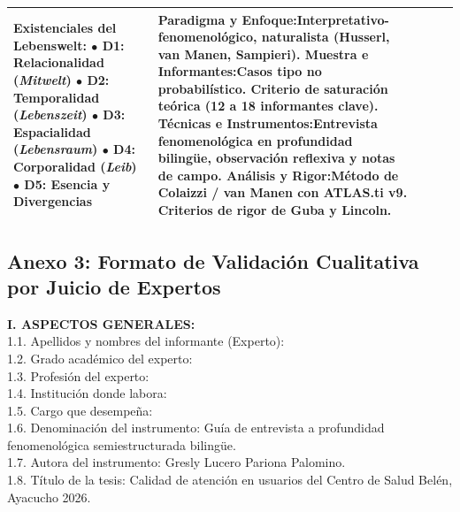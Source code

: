\begin{table}[H]
\begin{tabularx}{\textwidth}{p{2.6cm}p{2.7cm}p{2.6cm}p{2.6cm}X}
\textbf{Existenciales del Lebenswelt:}\newline 
$\bullet$ D1: Relacionalidad (\textit{Mitwelt})\newline 
$\bullet$ D2: Temporalidad (\textit{Lebenszeit})\newline 
$\bullet$ D3: Espacialidad (\textit{Lebensraum})\newline 
$\bullet$ D4: Corporalidad (\textit{Leib})\newline 
$\bullet$ D5: Esencia y Divergencias & 
\textbf{Paradigma y Enfoque:}\newline Interpretativo-fenomenológico, naturalista (Husserl, van Manen, Sampieri).\newline\newline 
\textbf{Muestra e Informantes:}\newline Casos tipo no probabilístico. Criterio de saturación teórica (12 a 18 informantes clave).\newline\newline 
\textbf{Técnicas e Instrumentos:}\newline Entrevista fenomenológica en profundidad bilingüe, observación reflexiva y notas de campo.\newline\newline 
\textbf{Análisis y Rigor:}\newline Método de Colaizzi / van Manen con ATLAS.ti v9. Criterios de rigor de Guba y Lincoln. \\
\bottomrule
\end{tabularx}
\end{table}

\vspace{0.5cm}

\subsection*{Anexo 3: Formato de Validación Cualitativa por Juicio de Expertos}
\label{anx:3_expertos}

\noindent\textbf{I. ASPECTOS GENERALES:}\\
1.1. Apellidos y nombres del informante (Experto): \hrulefill \\
1.2. Grado académico del experto: \hrulefill \\
1.3. Profesión del experto: \hrulefill \\
1.4. Institución donde labora: \hrulefill \\
1.5. Cargo que desempeña: \hrulefill \\
1.6. Denominación del instrumento: Guía de entrevista a profundidad fenomenológica semiestructurada bilingüe.\\
1.7. Autora del instrumento: Gresly Lucero Pariona Palomino.\\
1.8. Título de la tesis: Calidad de atención en usuarios del Centro de Salud Belén, Ayacucho 2026.

